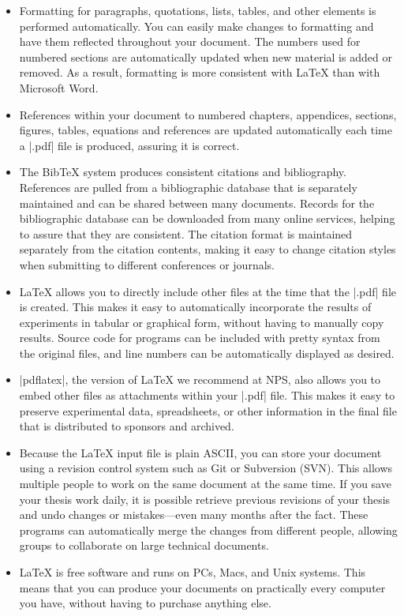 \begin{itemize}

\item Formatting for paragraphs, quotations, lists, tables, and other elements
  is performed automatically. You can easily make changes to formatting and
  have them reflected throughout your document.  The numbers used for numbered
  sections are automatically updated when new material is added or removed. As
  a result, formatting is more consistent with \LaTeX{} than with Microsoft
  Word.

\item References within your document to numbered chapters, appendices,
  sections, figures, tables, equations and references are updated automatically
  each time a |.pdf| file is produced, assuring it is correct.

\item The Bib\TeX{} system produces consistent citations and bibliography.
  References are pulled from a bibliographic database that is separately
  maintained and can be shared between many documents. Records for the
  bibliographic database can be downloaded from many online services, helping
  to assure that they are consistent. The citation format is maintained
  separately from the citation contents, making it easy to change citation
  styles when submitting to different conferences or journals.  

\item \LaTeX{} allows you to directly include other files at the time that the
  |.pdf| file is created. This makes it easy to automatically incorporate the
  results of experiments in tabular or graphical form, without having to
  manually copy results.  Source code for programs can be included with pretty
  syntax from the original files, and line numbers can be automatically
  displayed as desired. 

\item |pdflatex|, the version of \LaTeX{} we recommend at NPS, also allows you
  to embed other files as attachments within your |.pdf| file. This makes it
  easy to preserve  experimental data, spreadsheets, or other information in
  the final file that is distributed to sponsors and archived. 

\item Because the \LaTeX{} input file is plain ASCII, you can store your
  document using a revision control system such as Git or Subversion (SVN). 
  This allows multiple people to work on the same
  document at the same time. If you save your thesis work daily, it is 
  possible retrieve previous revisions of your thesis and undo changes 
  or mistakes---even many months after the fact.
  These programs can automatically merge the changes from different people,
  allowing groups to collaborate on large technical documents. 

\item \LaTeX{} is free software and runs on PCs, Macs, and Unix systems. This
  means that you can produce your documents on practically every computer you
  have, without having to purchase anything else.

\end{itemize}

